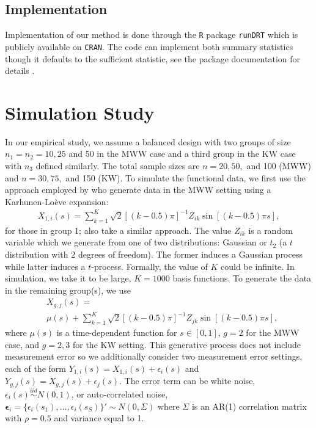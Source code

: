 \documentclass[12pt]{article}
\theoremstyle{plain}
\theoremstyle{remark}
\begin{document}
	\subsection{Implementation}

Implementation of our method is done through the \texttt{R} package \texttt{runDRT} which is publicly available on \texttt{CRAN}. The code can implement both summary statistics though it defaults to the sufficient statistic, see the package documentation for details \citep{runDRT2024}.


	\section{Simulation Study}
	\label{s:sim}
	
	In our empirical study, we assume a balanced design with two groups of size $n_1 = n_2 = 10, 25$ and 50 in the MWW case and a third group in the KW case with $n_3$ defined similarly. The total sample sizes are $n = 20, 50,$ and 100 (MWW) and $n = 30, 75,$ and 150 (KW). To simulate the functional data, we first use the approach employed by \cite{Chak2015} who generate data in the MWW setting using a Karhunen-Lo\`eve expansion:
	\begin{align*}
		X_{1,i}(s) = \sum_{k=1}^K \sqrt{2} \left[(k - 0.5)\pi \right]^{-1} Z_{ik} \sin\left[(k - 0.5)\pi s\right],
	\end{align*}
	for those in group 1; \cite{Berrett2021} also take a similar approach. The value $Z_{ik}$ is a random variable which we generate from one of two distributions: Gaussian or $t_2$ (a $t$ distribution with 2 degrees of freedom). The former induces a Gaussian process while latter induces a $t$-process. Formally, the value of $K$ could be infinite. In simulation, we take it to be large, $K = 1000$ basis functions. To generate the data in the remaining group(s), we use
	\begin{align*}
		&X_{g,j}(s) = \\
		&\mu(s) + \sum_{k=1}^K \sqrt{2} \left[(k - 0.5)\pi \right]^{-1} Z_{jk} \sin\left[(k - 0.5)\pi s\right],
	\end{align*}
	where $\mu(s)$ is a time-dependent function for $s \in [0,1]$, $g = 2$ for the MWW case, and $g = 2, 3$ for the KW setting. This generative process does not include measurement error so we additionally consider two measurement error settings, each of the form $Y_{1,i}(s) = X_{1,i}(s) + \epsilon_i(s)$ and $Y_{g,j}(s) = X_{g,j}(s) + \epsilon_j(s)$. The error term can be white noise, $\epsilon_i(s) \stackrel{iid}{\sim} N(0,1)$, or auto-correlated noise, $\boldsymbol{\epsilon}_i = \{\epsilon_i(s_1), \ldots, \epsilon_i(s_S)\}' \sim N(0, \Sigma)$ where $\Sigma$ is an AR(1) correlation matrix with $\rho = 0.5$ and variance equal to 1.
	
\end{document}
